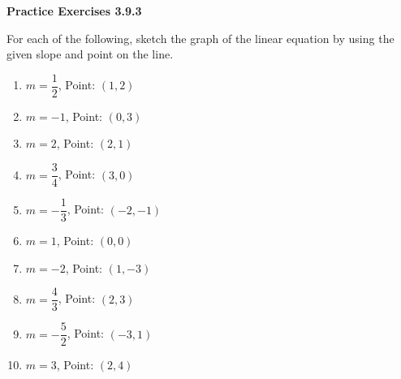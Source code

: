  \vspace{1ex}
\noindent\textbf{Practice Exercises 3.9.3}

\vspace{0.75ex}

For each of the following, sketch the graph of the linear equation by using the given slope and point on the line.

\begin{multicols}{2}
\begin{enumerate}[noitemsep, label = \color{blue}\arabic*. ]
    \item $m = \dfrac{1}{2}$, Point: $(1, 2)$
    \item $m = -1$, Point: $(0, 3)$
    \item $m = 2$, Point: $(2, 1)$
    \item $m = \dfrac{3}{4}$, Point: $(3, 0)$
    \item $m = -\dfrac{1}{3}$, Point: $(-2, -1)$
    \item $m = 1$, Point: $(0, 0)$
    \item $m = -2$, Point: $(1, -3)$
    \item $m = \dfrac{4}{3}$, Point: $(2, 3)$
    \item $m = -\dfrac{5}{2}$, Point: $(-3, 1)$
    \item $m = 3$, Point: $(2, 4)$
\end{enumerate}
\end{multicols}
